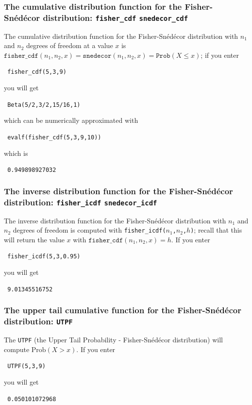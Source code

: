 \documentclass[a4paper,11pt]{book}
\begin{document}
\subsubsection{The cumulative distribution function  for the Fisher-Sn\'{e}d\'{e}cor distribution: \texttt{fisher\_cdf} \texttt{snedecor\_cdf}}

The cumulative distribution function for the Fisher-Sn\'{e}d\'{e}cor
distribution with $n_1$ and $n_2$ degrees of freedom at a value $x$ is
$\texttt{fisher\_cdf}(n_1,n_2,x) = \texttt{snedecor}(n_1,n_2,x) =
\texttt{Prob}(X \le x)$; if you enter
\begin{center}
  \tt
  fisher\_cdf(5,3,9)
\end{center}
you will get
\begin{center}
  \tt
  Beta(5/2,3/2,15/16,1)
\end{center}
which can be numerically approximated with
\begin{center}
  \tt
  evalf(fisher\_cdf(5,3,9,10))
\end{center}
which is
\begin{center}
  \tt
  0.949898927032
\end{center}

\subsubsection{The inverse distribution function for the Fisher-Sn\'{e}d\'{e}cor distribution: \texttt{fisher\_icdf} \texttt{snedecor\_icdf}}

The inverse distribution function for the 
Fisher-Sn\'{e}d\'{e}cor
distribution with $n_1$ and $n_2$ degrees of freedom is computed with
\texttt{fisher\_icdf($n_1$,$n_2$,$h$)}; recall that this will return the
value $x$ with $\texttt{fisher\_cdf}(n_1,n_2,x) = h$.  If you enter
\begin{center}
  \tt
  fisher\_icdf(5,3,0.95)
\end{center}
you will get
\begin{center}
  \tt
  9.01345516752
\end{center}

\subsubsection{The upper tail cumulative function for the Fisher-Sn\'{e}d\'{e}cor distribution: \texttt{UTPF}}

The \texttt{UTPF} (the Upper Tail Probability -
Fisher-Sn\'{e}d\'{e}cor distribution) will compute 
$\text{Prob}(X > x)$.  
If you enter
\begin{center}
  \tt
  UTPF(5,3,9)
\end{center}
you will get
\begin{center}
  \tt
  0.050101072968
\end{center}
\end{document}
